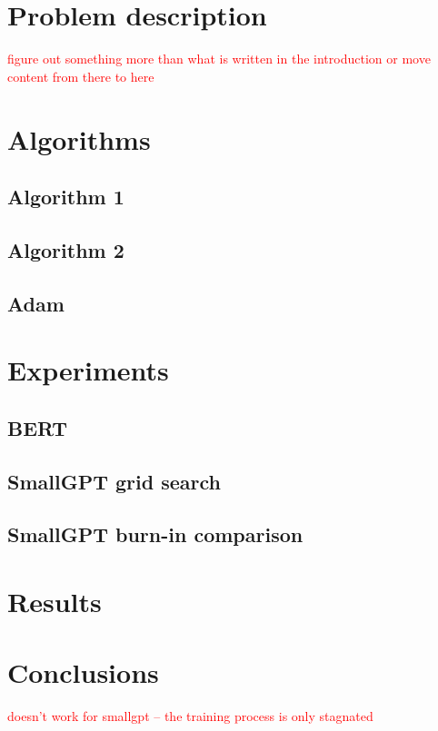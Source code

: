 \documentclass{article}
\begin{document}
\section{Problem description}

\textcolor{red}{figure out something more than what is written in the introduction or move content from there to here}

\section{Algorithms}

\subsection{Algorithm 1}

\subsection{Algorithm 2}

\subsection{Adam}

\section{Experiments}

\subsection{BERT}

\subsection{SmallGPT grid search}

\subsection{SmallGPT burn-in comparison}

\section{Results}

\section{Conclusions}

\textcolor{red}{doesn't work for smallgpt -- the training process is only stagnated}



\end{document}
